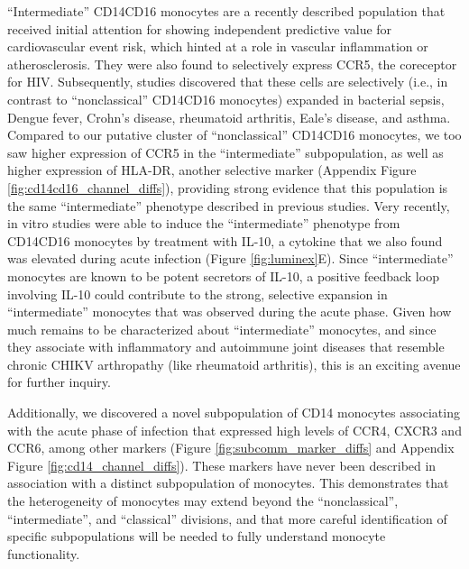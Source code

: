 “Intermediate” CD14\sups{++}\allowbreak CD16\sups{+} monocytes are a recently described population\autocite{Wong2011,Ziegler-Heitbrock2010} that received initial attention for showing independent predictive value for cardiovascular event risk,\autocite{Rogacev2012} which hinted at a role in vascular inflammation or atherosclerosis. They were also found to selectively express CCR5, the coreceptor for HIV.\autocite{Ellery2007} Subsequently, studies discovered that these cells are selectively (i.e., in contrast to “nonclassical” CD14\sups{+}\allowbreak CD16\sups{++} monocytes) expanded in bacterial sepsis, Dengue fever, Crohn’s disease, rheumatoid arthritis, Eale’s disease, and asthma.\autocite{Wong2012} Compared to our putative cluster of “nonclassical” CD14\sups{+}\allowbreak CD16\sups{++} monocytes, we too saw higher expression of CCR5 in the “intermediate” subpopulation, as well as higher expression of HLA-DR, another selective marker (Appendix Figure \ref{fig:cd14cd16_channel_diffs}), providing strong evidence that this population is the same “intermediate” phenotype described in previous studies.\autocite{Zawada2011} Very recently, in vitro studies were able to induce the “intermediate” phenotype from CD14\sups{+}\allowbreak CD16 monocytes by treatment with IL-10,\autocite{Tsukamoto2017} a cytokine that we also found was elevated during acute infection (Figure \ref{fig:luminex}E). Since “intermediate” monocytes are known to be potent secretors of IL-10,\autocite{Skrzeczynska-Moncznik2008} a positive feedback loop involving IL-10 could contribute to the strong, selective expansion in “intermediate” monocytes that was observed during the acute phase. Given how much remains to be characterized about “intermediate” monocytes, and since they associate with inflammatory and autoimmune joint diseases that resemble chronic CHIKV arthropathy (like rheumatoid arthritis), this is an exciting avenue for further inquiry.

Additionally, we discovered a novel subpopulation of CD14\sups{+} monocytes associating with the acute phase of infection that expressed high levels of CCR4, CXCR3 and CCR6, among other markers (Figure \ref{fig:subcomm_marker_diffs} and Appendix Figure \ref{fig:cd14_channel_diffs}). These markers have never been described in association with a distinct subpopulation of monocytes. This demonstrates that the heterogeneity of monocytes may extend beyond the “nonclassical”, “intermediate”, and “classical” divisions,\autocite{Appleby2013} and that more careful identification of specific subpopulations will be needed to fully understand monocyte functionality.\autocite{Stansfield2015}

